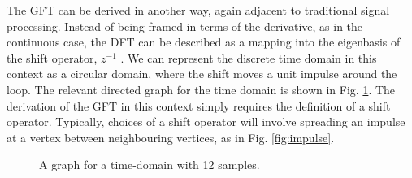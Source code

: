\documentclass[12pt,a4paper]{article} %
\begin{document}
The GFT can be derived in another way, again adjacent to traditional signal processing. Instead of being framed in terms of the derivative, as in the continuous case, the DFT can be described as a mapping into the eigenbasis of the shift operator, $z^{-1}$ \cite{moura}. We can represent the discrete time domain in this context as a circular domain, where the shift moves a unit impulse around the loop. The relevant directed graph for the time domain is shown in Fig. \ref{fig:cycle12}. The derivation of the GFT in this context simply requires the definition of a shift operator. Typically, choices of a shift operator will involve spreading an impulse at a vertex between neighbouring vertices, as in Fig. \ref{fig:impulse}.

\begin{figure}[!ht]
    \centering
    \caption{A graph for a time-domain with 12 samples.}
    \label{fig:cycle12}
\end{figure}
\end{document}
